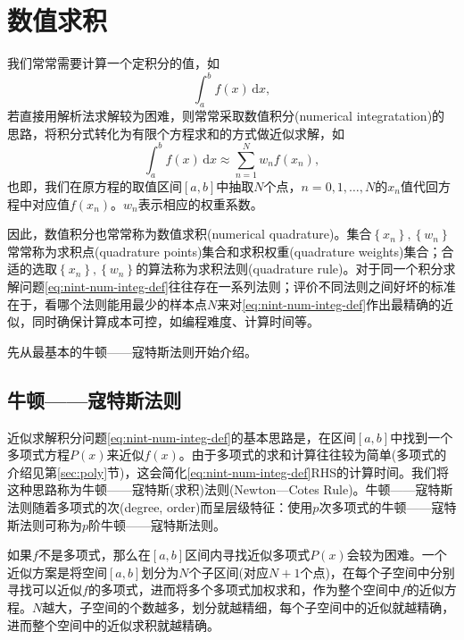 \section{数值求积}
\label{sec:numerical-integration-ncrule}

我们常常需要计算一个定积分的值，如
\begin{equation*}
  \int_{a}^{b} f(x) \, \mathrm{d}x,
\end{equation*}
若直接用解析法求解较为困难，则常常采取数值积分(numerical integratation)的思路，将积分式转化为有限个方程求和的方式做近似求解，如
\begin{equation}
  \label{eq:nint-num-integ-def}
  \int_{a}^{b} f(x) \, \mathrm{d} x \approx \sum_{n=1}^{N} w_{n} f \left( x_{n} \right),
\end{equation}
也即，我们在原方程的取值区间$[a,b]$中抽取$N$个点，$n=0,1,\ldots,N$的$x_{n}$值代回方程中对应值$f \left(x_{n} \right)$。$w_{n}$表示相应的权重系数。

因此，数值积分也常常称为数值求积(numerical quadrature)。集合$\left\{ x_{n} \right\},\left\{ w_{n} \right\}$常常称为求积点(quadrature points)集合和求积权重(quadrature weights)集合；合适的选取$\left\{ x_{n} \right\},\left\{ w_{n} \right\}$的算法称为求积法则(quadrature rule)。对于同一个积分求解问题\eqref{eq:nint-num-integ-def}往往存在一系列法则；评价不同法则之间好坏的标准在于，看哪个法则能用最少的样本点$N$来对\eqref{eq:nint-num-integ-def}作出最精确的近似，同时确保计算成本可控，如编程难度、计算时间等。

先从最基本的牛顿——寇特斯法则开始介绍。

\subsection{牛顿——寇特斯法则}
\label{sec:nint-nc-rule}
近似求解积分问题\eqref{eq:nint-num-integ-def}的基本思路是，在区间$[a,b]$中找到一个多项式方程$P(x)$来近似$f(x)$。由于多项式的求和计算往往较为简单(多项式的介绍见第\ref{sec:poly}节)，这会简化\eqref{eq:nint-num-integ-def}RHS的计算时间。我们将这种思路称为牛顿——寇特斯(求积)法则(Newton—Cotes Rule)。牛顿——寇特斯法则随着多项式的次(degree, order)而呈层级特征：使用$p$次多项式的牛顿——寇特斯法则可称为$p$阶牛顿——寇特斯法则。

如果$f$不是多项式，那么在$[a,b]$区间内寻找近似多项式$P(x)$会较为困难。一个近似方案是将空间$[a,b]$划分为$N$个子区间(对应$N+1$个点)，在每个子空间中分别寻找可以近似$f$的多项式，进而将多个多项式加权求和，作为整个空间中$f$的近似方程。$N$越大，子空间的个数越多，划分就越精细，每个子空间中的近似就越精确，进而整个空间中的近似求积就越精确。

